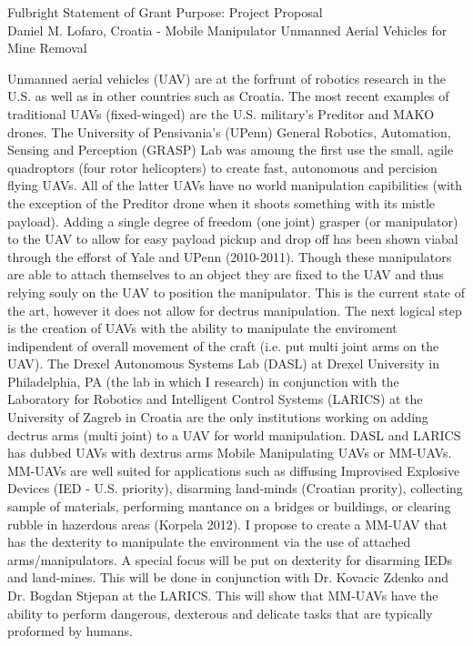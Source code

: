 \documentclass[12pt]{article}
\begin{document}
\begin{center}
Fulbright Statement of Grant Purpose: Project Proposal\\
Daniel M. Lofaro, Croatia - 
Mobile Manipulator Unmanned Aerial Vehicles for Mine Removal\\

\end{center}

Unmanned aerial vehicles (UAV) are at the forfrunt of robotics research in the U.S. as well as in other countries such as Croatia.  The most recent examples of traditional UAVs (fixed-winged) are the U.S. military's Preditor and MAKO drones.  The University of Pensivania's (UPenn) General Robotics, Automation, Sensing and Perception (GRASP) Lab was amoung the first use the small, agile quadroptors (four rotor helicopters) to create fast, autonomous and percision flying UAVs.  All of the latter UAVs have no world manipulation capibilities (with the exception  of the Preditor drone when it shoots something with its mistle payload).  Adding a single degree of freedom (one joint) grasper (or manipulator) to the UAV to allow for easy payload pickup and drop off has been shown viabal through the efforst of Yale and UPenn (2010-2011).  Though these manipulators are able to attach themselves to an object they are fixed to the UAV and thus relying souly on the UAV to position the manipulator.  This is the current state of the art, however it does not allow for dectrus manipulation.  The next logical step is the creation of UAVs with the ability to manipulate the enviroment indipendent of overall movement of the craft (i.e. put multi joint arms on the UAV).   The Drexel Autonomous Systems Lab (DASL) at Drexel University in Philadelphia, PA (the lab in which I research) in conjunction with the Laboratory for Robotics and Intelligent Control Systems (LARICS) at the University of Zagreb in Croatia are the only institutions working on adding dectrus arms (multi joint) to a UAV for world manipulation.  DASL and LARICS has dubbed UAVs with dextrus arms Mobile Manipulating UAVs or MM-UAVs.  MM-UAVs are well suited for applications such as diffusing Improvised Explosive Devices (IED - U.S. priority), disarming land-minds (Croatian prority), collecting sample of materials, performing mantance on a bridges or buildings, or clearing rubble in hazerdous areas (Korpela 2012).  I propose to create a MM-UAV that has the dexterity to manipulate the environment via the use of attached  arms/manipulators.  A special focus will be put on dexterity for disarming IEDs and land-mines.  This will be done in conjunction with Dr. Kovacic Zdenko and Dr. Bogdan Stjepan at the LARICS.  This will show that MM-UAVs have the ability to perform dangerous, dexterous and delicate tasks that are typically proformed by humans.
\end{document}
